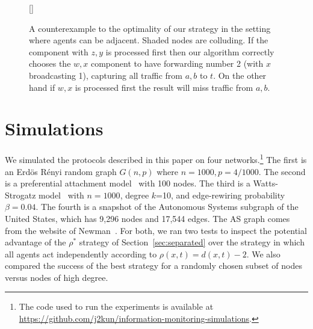 \documentclass[prodmode,acmec]{ec-acmsmall}
\begin{document}
\begin{figure}[h]
[\FBwidth]
{\caption{A counterexample to the optimality of our strategy in the setting
where agents can be adjacent. Shaded nodes are colluding. If the component with
$z,y$ is processed first then our algorithm correctly chooses the $w,x$
component to have forwarding number 2 (with $x$ broadcasting 1), capturing all
traffic from $a,b$ to $t$.  On the other hand if $w,x$ is processed first the
result will miss traffic from $a,b$.} \label{fig:forwarding-ctex}}
{} \end{figure}


\section{Simulations} \label{sec:simulations}
 
We simulated the protocols described in this paper on four
networks.\footnote{The code used to run the experiments is available at
\url{https://github.com/j2kun/information-monitoring-simulations}.} The first
is an Erd\"os R\'enyi random graph $G(n, p)$ where $n = 1000, p = 4/1000$. The
second is a preferential attachment model~\cite{BarabasiA99} with 100 nodes.
The third is a Watts-Strogatz model~\cite{WattsS98} with $n=1000$, degree
$k$=10, and edge-rewiring probability $\beta=0.04$. The fourth is a snapshot of
the Autonomous Systems subgraph of the United States, which has 9,296 nodes and
17,544 edges. The AS graph comes from the website of Newman~\cite{Newman06}.
For both, we ran two tests to inspect the potential advantage of the $\rho^*$
strategy of Section~\ref{sec:separated} over the strategy in which all agents
act independently according to $\rho(x,t) = d(x,t) - 2$. We also compared the
success of the best strategy for a randomly chosen subset of nodes versus nodes
of high degree.
\end{document}
